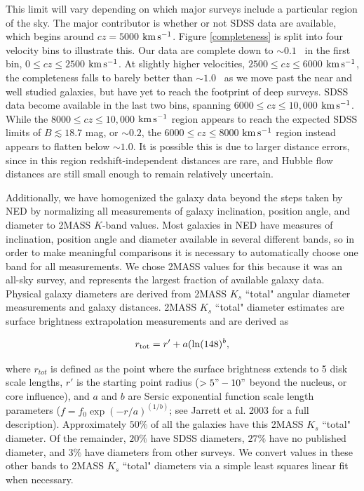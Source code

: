This limit will vary depending on which major surveys include a particular region of the sky. The major contributor is whether or not SDSS data are available, which begins around $cz = 5000$ $\rm km\, s^{-1}$. Figure \ref{completeness} is split into four velocity bins to illustrate this. Our data are complete down to $\sim0.1$\Lstar~ in the first bin, $0 \leq cz \leq 2500$ $\rm km\, s^{-1}$. At slightly higher velocities, $2500 \leq cz \leq 6000$ $\rm km\, s^{-1}$, the completeness falls to barely better than $\sim1.0$\Lstar~ as we move past the near and well studied galaxies, but have yet to reach the footprint of deep surveys. SDSS data become available in the last two bins, spanning $6000 \leq cz \leq 10,000$ $\rm km\, s^{-1}$. While the $8000 \leq cz \leq 10,000$ $\rm km\, s^{-1}$ region appears to reach the expected SDSS limits of $B \lesssim 18.7$ mag, or $\sim0.2$\Lstar, the $6000 \leq cz \leq 8000$ $\rm km\, s^{-1}$ region instead appears to flatten below $\sim 1.0$\Lstar. It is possible this is due to larger distance errors, since in this region redshift-independent distances are rare, and Hubble flow distances are still small enough to remain relatively uncertain.

Additionally, we have homogenized the galaxy data beyond the steps taken by NED by normalizing all measurements of galaxy inclination, position angle, and diameter to 2MASS $K$-band values. Most galaxies in NED have measures of inclination, position angle and diameter available in several different bands, so in order to make meaningful comparisons it is necessary to automatically choose one band for all measurements. We chose 2MASS values for this because it was an all-sky survey, and represents the largest fraction of available galaxy data. Physical galaxy diameters are derived from 2MASS $K_{s}$ ``total" angular diameter measurements and galaxy distances. 2MASS $K_{s}$ ``total" diameter estimates are surface brightness extrapolation measurements and are derived as 

\begin{equation}
	r_{\rm tot} = r' + a(\ln(148)^b,
\end{equation}

\noindent where $r_{tot}$ is defined as the point where the surface brightness extends to 5 disk scale lengths, $r'$ is the starting point radius ($>5" - 10"$ beyond the nucleus, or core influence), and $a$ and $b$ are Sersic exponential function scale length parameters ($f = f_0 \exp{(-r/a)}^{(1/b)}$; see Jarrett et al. 2003 for a full description). Approximately $50\%$ of all the galaxies have this 2MASS $K_{s}$ ``total" diameter. Of the remainder, $20\%$ have SDSS diameters, $27\%$ have no published diameter, and $3\%$ have diameters from other surveys. We convert values in these other bands to 2MASS $K_{s}$ ``total" diameters via a simple least squares linear fit when necessary.

